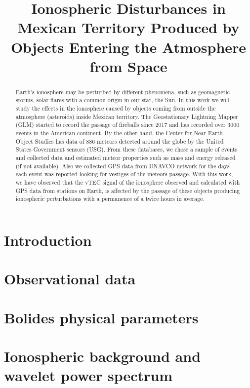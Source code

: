 \documentclass[12pt]{article}
\title{Ionospheric Disturbances in Mexican Territory Produced by Objects Entering the Atmosphere from Space}
\begin{document}
\maketitle


\begin{abstract}
Earth's ionosphere may be perturbed by different phenomena, such as %
geomagnetic storms, solar flares with a common origin in our star, the Sun. In this work we will study the effects in the ionosphere caused by objects coming from outside the atmosphere (asteroids) inside Mexican territory. The Geostationary Lightning Mapper (GLM) started to record the passage of fireballs since 2017 and has recorded over 3000 events in the American continent. By the other hand, the Center for Near Earth Object Studies has data of 886 meteors detected around the globe by the United States Government sensors (USG). From these databases, we chose a sample of events and collected data and estimated meteor properties such as mass and energy released (if not available). Also we collected GPS data from UNAVCO network for the days each event was reported looking for vestiges of the meteors passage. With this work, we have observed that the vTEC signal
 of the ionosphere observed and calculated with GPS data from stations on Earth, is affected by the passage of these objects producing ionospheric perturbations with a permanence of a twice hours in average.  
\end{abstract}


\section{Introduction}
\label{sec1}


\section{Observational data}
\label{sec:methodology}


\section{Bolides physical parameters}
\label{sec:bolides}

\section{Ionospheric background and wavelet power spectrum}
\label{sec:vTEC-maps}
     
\end{document}
